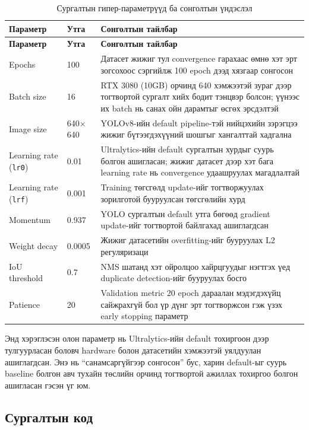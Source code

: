 \begin{longtable}{|p{2.8cm}|p{1.5cm}|p{7.1cm}|}
\caption{Сургалтын гипер-параметрүүд ба сонголтын үндэслэл}
\label{tab:hyperparameters} \\
\hline
\textbf{Параметр} & \textbf{Утга} & \textbf{Сонголтын тайлбар} \\
\hline
\endfirsthead
\hline
\textbf{Параметр} & \textbf{Утга} & \textbf{Сонголтын тайлбар} \\
\hline
\endhead
\hline
\endfoot
Epochs & 100 & Датасет жижиг тул convergence гарахаас өмнө хэт эрт зогсохоос сэргийлж 100 epoch дээд хязгаар сонгосон \\
\hline
Batch size & 16 & RTX 3080 (10GB) орчинд 640 хэмжээтэй зураг дээр тогтвортой сургалт хийх бодит тэнцвэр болсон; үүнээс их batch нь санах ойн дарамтыг өсгөх эрсдэлтэй \\
\hline
Image size & 640$\times$640 & YOLOv8-ийн default pipeline-тэй нийцэхийн зэрэгцээ жижиг бүтээгдэхүүний шошгыг хангалттай хадгална \\
\hline
Learning rate (\texttt{lr0}) & 0.01 & Ultralytics-ийн default сургалтын хурдыг суурь болгон ашигласан; жижиг датасет дээр хэт бага learning rate нь convergence удаашруулах магадлалтай \\
\hline
Learning rate (\texttt{lrf}) & 0.001 & Training төгсгөлд update-ийг тогтворжуулах зорилготой бууруулсан төгсгөлийн хурд \\
\hline
Momentum & 0.937 & YOLO сургалтын default утга бөгөөд gradient update-ийг тогтвортой байлгахад ашиглагдсан \\
\hline
Weight decay & 0.0005 & Жижиг датасетийн overfitting-ийг бууруулах L2 регуляризаци \\
\hline
IoU threshold & 0.7 & NMS шатанд хэт ойролцоо хайрцгуудыг нэгтгэх үед duplicate detection-ийг бууруулах босго \\
\hline
Patience & 20 & Validation metric 20 epoch дараалан мэдэгдэхүйц сайжрахгүй бол үр дүнг эрт тогтворжсон гэж үзэх early stopping параметр \\
\hline
\end{longtable}

Энд хэрэглэсэн олон параметр нь Ultralytics-ийн default тохиргоон дээр тулгуурласан боловч hardware болон датасетийн хэмжээтэй уялдуулан ашиглагдсан. Энэ нь ``санамсаргүйгээр сонгосон'' бус, харин default-ыг суурь baseline болгон авч тухайн төслийн орчинд тогтвортой ажиллах тохиргоо болгон ашигласан гэсэн үг юм.

\subsection{Сургалтын код}

